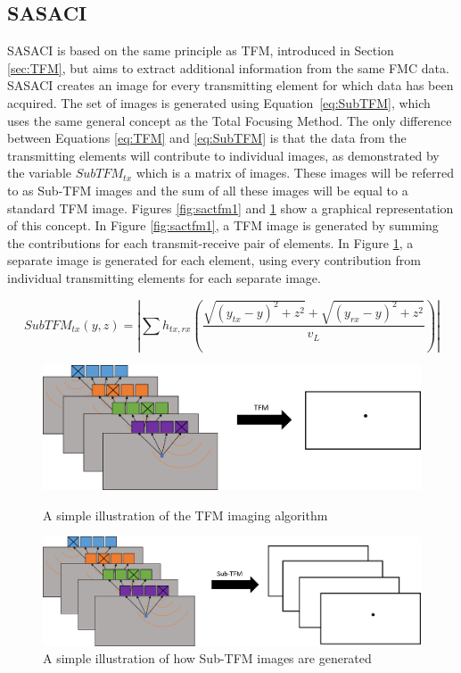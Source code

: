 \subsection{SASACI}\label{sec:sasaci}
SASACI is based on the same principle as TFM, introduced in Section \ref{sec:TFM}, but aims to extract additional information from the same FMC data. SASACI creates an image for every transmitting element for which data has been acquired. The set of images is generated using Equation~\ref{eq:SubTFM}, which uses the same general concept as the Total Focusing Method. The only difference between Equations \ref{eq:TFM} and \ref{eq:SubTFM} is that the data from the transmitting elements will contribute to individual images, as demonstrated by the variable $SubTFM_{tx}$ which is a matrix of images. These images will be referred to as Sub-TFM images and the sum of all these images will be equal to a standard TFM image. Figures \ref{fig:sactfm1} and \ref{fig:sactfm2} show a graphical representation of this concept. In Figure \ref{fig:sactfm1}, a TFM image is generated by summing the contributions for each transmit-receive pair of elements. In Figure \ref{fig:sactfm2}, a separate image is generated for each element, using every contribution from individual transmitting elements for each separate image.

 \begin{equation} \label{eq:SubTFM}
SubTFM_{tx}(y,z) = | \sum h_{tx,rx} (\frac{\sqrt{(y_{tx} - y)^2 + z^2} + \sqrt{(y_{rx} - y)^2 + z^2}}{v_L}) |
 \end{equation}

\begin{figure}[htb]
\centering
		\includegraphics[width=\textwidth]{sactfm1.png}
		\caption{A simple illustration of the TFM imaging algorithm}
		\label{fig:sactfm1}
		\vspace{10mm}
		\includegraphics[width=\textwidth]{sactfm2.png}
		\caption{A simple illustration of how Sub-TFM images are generated}
		\label{fig:sactfm2}
		
\end{figure}


